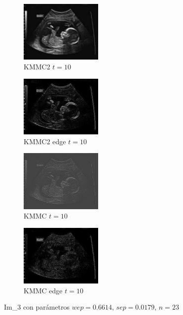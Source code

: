 \documentclass[a4paper,10pt,twocolumn]{article}
\begin{document}
\begin{center}
\begin{figure}[!htb]
		\begin{subfigure}[h!]{4cm}
			\includegraphics[width=4cm]{image/im3/im_3_10}
			\caption{KMMC2 $t = 10$}
		\end{subfigure}
		\begin{subfigure}[i!]{4cm}
			\includegraphics[width=4cm]{image/im3/im_3_10_edge}
			\caption{KMMC2 edge $t = 10$}
		\end{subfigure}
		\begin{subfigure}[j!]{4cm}
			\includegraphics[width=4cm]{image/im3/im_3_10_norm}
			\caption{KMMC $t = 10$}
		\end{subfigure}
		\begin{subfigure}[k!]{4cm}
			\includegraphics[width=4cm]{image/im3/im_3_10_norm_edge}
			\caption{KMMC edge $t = 10$}
		\end{subfigure}
		
		\caption{Im\_3 con par\'ametros $wep = 0.6614$, $sep = 0.0179$, $n = 23$}
	\end{figure}
\end{center}

\newpage
\end{document}
